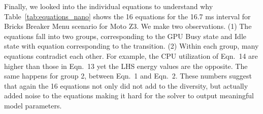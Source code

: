 Finally, we looked into the individual equations to understand why 
Table~\ref{tab:equations_nano} shows the 16 equations for the 16.7 ms interval for Bricks Breaker Menu scenario for Moto Z3.
We make two observations.
(1) The equations fall into two groups, corresponding to the GPU Busy state and Idle state with equation corresponding to the transition. 
(2) Within each group, many equations contradict each other. For example,
the CPU utilization of Eqn.~14 are higher than 
those in Eqn.~13 yet the LHS energy values are the opposite. The same happens for group 2, \eg between Eqn.~1 and Eqn.~2. 
These numbers suggest that again the 16 equations not only did not add to the diversity, but actually
added noise to the equations making it hard for the solver to output meaningful model parameters. 



